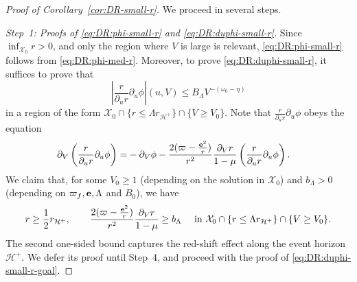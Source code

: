 \documentclass[10pt, reqno]{amsart}
\theoremstyle{definition}
\theoremstyle{remark}
\theoremstyle{conjecture}
\numberwithin{equation}{section}
\newcommand{\set}[1]{\{#1\}}
\newcommand{\rd}{\partial}
\newcommand{\0}{\emptyset}
\newcommand{\Lmb}{\Lambda}
\newcommand{\omg}{\omega}
\newcommand{\bfe}{{\bf e}}
\newcommand{\calH}{\mathcal H}
\newcommand{\calX}{\mathcal X}
\newcommand{\EH}{\calH^{+}}
\newcommand{\pfstep}[1]{\vspace{.5em} {\it \noindent #1.}}
\newcommand{\e}{\bfe}							%
\newcommand{\Abs}[1]{\left\vert #1 \right\vert}
\begin{document}
\begin{proof}[Proof of Corollary~\ref{cor:DR-small-r}]
We proceed in several steps.

\pfstep{Step~1: Proofs of \eqref{eq:DR:phi-small-r} and \eqref{eq:DR:duphi-small-r}}
Since $\inf_{\calX_{0}} r > 0$, and only the region where $V$ is large is relevant, \eqref{eq:DR:phi-small-r} follows from \eqref{eq:DR:phi-med-r}. Moreover, to prove \eqref{eq:DR:duphi-small-r}, it suffices to prove that 
\begin{equation} \label{eq:DR:duphi-small-r-goal}
	\Abs{\frac{r}{\rd_{u} r} \rd_{u} \phi}(u, V) \leq B_{\Lmb} V^{-(\omg_{0}-\eta)} 
\end{equation}
in a region of the form $\calX_{0} \cap \set{r \leq \Lmb r_{\EH}} \cap \set{V \geq V_{0}}$. Note that $\frac{r}{\rd_{u} r} \rd_{u} \phi$ obeys the equation 
\begin{align}
	\rd_{V} \left(\frac{r}{\rd_{u} r} \rd_{u} \phi \right)
=& 	- \rd_{V} \phi
	- \frac{2 (\varpi - \frac{\e^{2}}{r})}{r^{2}} \frac{\rd_{V} r}{1-\mu} \left( \frac{r}{\rd_{u} r} \rd_{u} \phi \right) . \label{eq:dVrduphi}
\end{align}
We claim that, for some $V_{0} \geq 1$ (depending on the solution in $\calX_{0}$) and $b_{\Lmb} > 0$ (depending on $\varpi_{f}, \e, \Lmb$ and $B_{0}$), we have
\begin{equation} \label{eq:DR-small-r:redshift}
	r \geq \frac{1}{2} r_{\EH}, \qquad 
	\frac{2 (\varpi-\frac{\e^{2}}{r})}{r^{2}} \frac{\rd_{V} r}{1-\mu} \geq b_{\Lmb} \quad \hbox{ in } \calX_{0} \cap \set{r \leq \Lmb r_{\EH}} \cap \set{V \geq V_{0}} .
\end{equation}
The second one-sided bound captures the red-shift effect along the event horizon $\EH$. We defer its proof until Step~4, and proceed with the proof of \eqref{eq:DR:duphi-small-r-goal}.


\end{proof}
\end{document}
